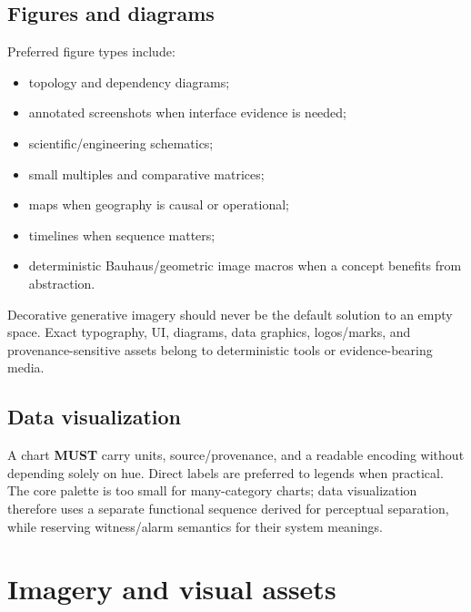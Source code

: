 \documentclass[11pt,twoside,openany]{report}
\newcommand{\MUST}{\textbf{MUST}\xspace}
\begin{document}
\section{Figures and diagrams}
Preferred figure types include:
\begin{itemize}
  \item topology and dependency diagrams;
  \item annotated screenshots when interface evidence is needed;
  \item scientific/engineering schematics;
  \item small multiples and comparative matrices;
  \item maps when geography is causal or operational;
  \item timelines when sequence matters;
  \item deterministic Bauhaus/geometric image macros when a concept benefits from abstraction.
\end{itemize}

\begin{alarmbox}
Decorative generative imagery should never be the default solution to an empty space. Exact typography, UI, diagrams, data graphics, logos/marks, and provenance-sensitive assets belong to deterministic tools or evidence-bearing media.
\end{alarmbox}

\section{Data visualization}
A chart \MUST carry units, source/provenance, and a readable encoding without depending solely on hue. Direct labels are preferred to legends when practical. The core palette is too small for many-category charts; data visualization therefore uses a separate functional sequence derived for perceptual separation, while reserving witness/alarm semantics for their system meanings.

\clearpage
\chapter{Imagery and visual assets}
\end{document}
